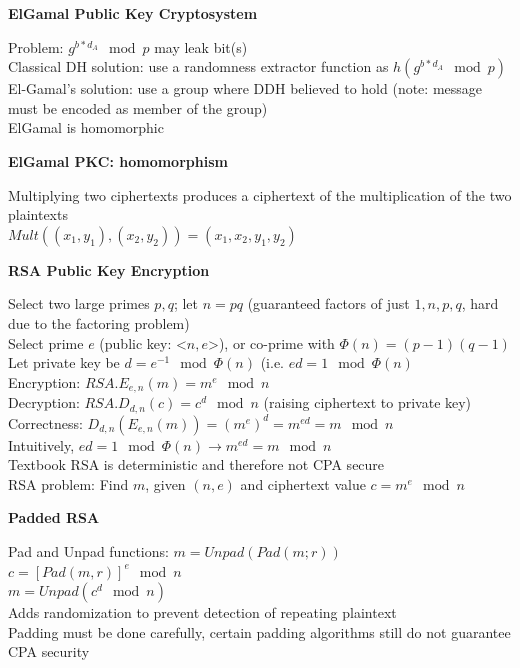 \documentclass{article}
\begin{document}
\textbf{ElGamal Public Key Cryptosystem}

Problem: $g^{b*d_A}\mod p$ may leak bit(s)\\
Classical DH solution: use a randomness extractor function as $h(g^{b*d_A}\mod p)$\\
El-Gamal's solution: use a group where DDH believed to hold (note: message must be encoded as member of the group)\\
ElGamal is homomorphic

\textbf{ElGamal PKC: homomorphism}

Multiplying two ciphertexts produces a ciphertext of the multiplication of the two plaintexts\\
$Mult\left((x_1,y_1),(x_2,y_2)\right)=(x_1,x_2,y_1,y_2)$

\textbf{RSA Public Key Encryption}

Select two large primes $p,q$; let $n=pq$ (guaranteed factors of just $1,n,p,q$, hard due to the factoring problem)\\
Select prime $e$ (public key: <$n,e$>), or co-prime with $\Phi (n)=(p-1)(q-1)$\\
Let private key be $d=e^{-1}\mod\Phi (n)$ (i.e. $ed=1\mod\Phi(n)$\\
Encryption: $RSA.E_{e,n}(m)=m^e\mod n$\\
Decryption: $RSA.D_{d,n}(c)=c^d\mod n$ (raising ciphertext to private key)\\
Correctness: $D_{d,n}(E_{e,n}(m))=(m^e)^d=m^{ed}=m\mod n$\\
Intuitively, $ed=1\mod\Phi(n)\rightarrow m^{ed}=m\mod n$\\
Textbook RSA is deterministic and therefore not CPA secure\\
RSA problem: Find $m$, given $(n,e)$ and ciphertext value $c=m^e\mod n$

\textbf{Padded RSA}

Pad and Unpad functions: $m=Unpad(Pad(m;r))$\\
$c=[Pad(m,r)]^e\mod n$\\
$m=Unpad(c^d\mod n)$\\
Adds randomization to prevent detection of repeating plaintext\\
Padding must be done carefully, certain padding algorithms still do not guarantee CPA security
\end{document}
